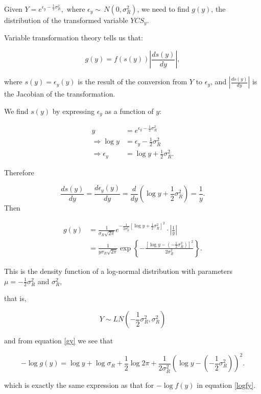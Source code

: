 \begin{appendices}
Given \(Y = e^{\epsilon_y - \frac{1}{2}\sigma^2_R},\,\, \text{where } \epsilon_y \sim \,N(0, \sigma^2_R)\), we need to find \(g(y)\), the distribution of the transformed variable \(YCS_y\).

Variable transformation theory tells us that:

\[g(y) = f(s(y))\left\vert \frac{d s(y)}{dy}\right\vert,\]

where \(s(y)=\epsilon_y(y)\) is the result of the conversion from \(Y\) to \(\epsilon_y\), and \(\left\vert \frac{d s(y)}{dy}\right\vert\) is the Jacobian of the transformation.

We find \(s(y)\) by expressing \(\epsilon_y\) as a function of \(y\):

\begin{align}
y &= e^{\epsilon_y - \frac{1}{2}\sigma^2_R} \nonumber \\
\Rightarrow \log y &= \epsilon_y - \frac{1}{2}\sigma^2_R \nonumber \\
\Rightarrow \epsilon_y &= \log y + \frac{1}{2}\sigma^2_R.
\end{align}

Therefore

\[\frac{d s(y)}{dy} = \frac{d \epsilon_y(y)}{dy} = \frac{d}{dy}\left(\log y + \frac{1}{2}\sigma^2_R\right) =\frac{1}{y}.\]
Then

\begin{align}
g(y) &= \frac{1}{\sigma_R\sqrt{2\pi}}e^{-\frac{1}{2\sigma_R^2}\left[\log y + \frac{1}{2}\sigma^2_R \right]^2}\cdot \left\vert \frac{1}{y}\right\vert \nonumber \\
&=\frac{1}{y\sigma_R\sqrt{2\pi}}\exp\left\{-\frac{[\log y - (-\frac{1}{2}\sigma^2_R)]^2}{2\sigma^2_R}\right\}.
\label{gy}
\end{align}

This is the density function of a log-normal distribution with parameters
\(\mu= -\frac{1}{2}\sigma^2_R\) and \(\sigma^2_R\),

that is,

 \[Y \sim LN\left(-\frac{1}{2}\sigma^2_R, \sigma^2_R\right)\]

and from equation \ref{gy} we see that

\begin{equation}
-\log g(y)= \log y + \log \sigma_R + \frac{1}{2}\log 2\pi + \frac{1}{2\sigma_R^2}\left(\log y - (-\frac{1}{2}\sigma^2_R)\right)^2.
\label{loggy}
\end{equation}

which is exactly the same expression as that for \(-\log f(y)\) in equation \ref{logfy}.


\end{appendices}
